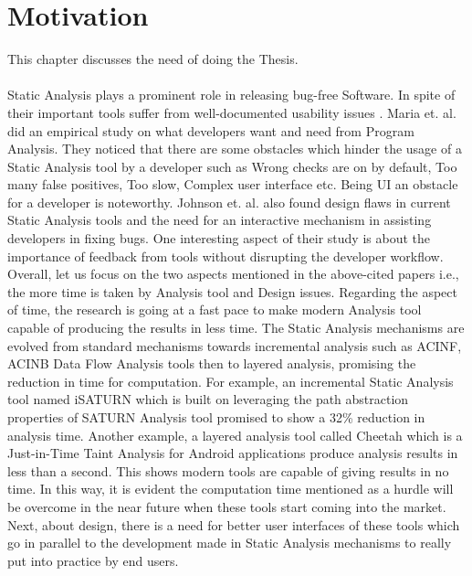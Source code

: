 \chapter{Motivation}
\label{ch:motivation}

This chapter discusses the need of doing the Thesis. \\ \\

Static Analysis plays a prominent role in releasing bug-free Software. In spite of their important tools suffer from well-documented usability issues \cite{CB16,JSMB13}.  Maria et. al. \cite{CB16} did an empirical study on what developers want and need from Program Analysis. They noticed that there are some obstacles which hinder the usage of a Static Analysis tool by a developer such as Wrong checks are on by default, Too many false positives, Too slow,  Complex user interface etc. Being UI an obstacle for a developer is noteworthy. Johnson et. al. \cite{JSMB13} also found design flaws in current Static Analysis tools and the need for an interactive mechanism in assisting developers in fixing bugs. One interesting aspect of their study is about the importance of feedback from tools without disrupting the developer workflow. \\

Overall, let us focus on the two aspects mentioned in the above-cited papers i.e., the more time is taken by Analysis tool and Design issues. Regarding the aspect of time, the research is going at a fast pace to make modern Analysis tool capable of producing the results in less time. The Static Analysis mechanisms are evolved from standard mechanisms towards incremental analysis such as ACINF, ACINB Data Flow Analysis tools then to layered analysis, promising the reduction in time for computation. For example,  an incremental Static Analysis tool named iSATURN \cite{iSaturn} which is built on leveraging the path abstraction properties of SATURN \cite{Xie} Analysis tool promised to show a 32\% reduction in analysis time. Another example, a layered analysis tool called Cheetah \cite{JIT} which is a Just-in-Time Taint Analysis for Android applications produce analysis results in less than a second. This shows modern tools are capable of giving results in no time. In this way, it is evident the computation time mentioned as a hurdle will be overcome in the near future when these tools start coming into the market. Next, about design, there is a need for better user interfaces of these tools which go in parallel to the development made in Static Analysis mechanisms to really put into practice by end users. \\

